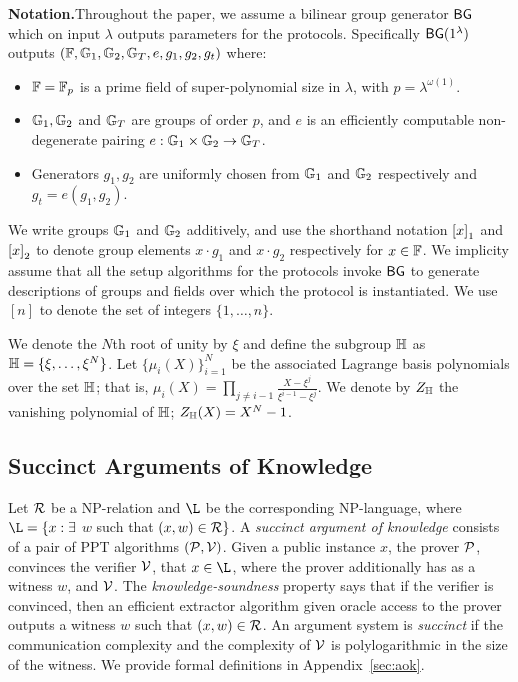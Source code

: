 
\noindent\textbf{Notation.}Throughout the paper, we assume a bilinear group generator $\mathsf{BG}$ which on input $\lambda$ outputs
parameters for the protocols. Specifically $\mathsf{BG}(1^{\lambda})$ outputs $(\mathbb{F},\mathbb{G}_1,\mathbb{G}_2,\mathbb{G}_T, e, g_1, g_2,g_t)$
where:
\begin{itemize}[leftmargin=2em, label=-]
	\item $\mathbb{F}={\mathbb{F}_p}$ is a prime field of super-polynomial size in $\lambda$, with $p=\lambda^{\omega(1)}$.
	\item $\mathbb{G}_1,\mathbb{G}_2$ and $\mathbb{G}_T$ are groups of order $p$, and $e$ is an efficiently computable non-degenerate
	pairing $e:\mathbb{G}_1\times \mathbb{G}_2\rightarrow \mathbb{G}_T$.
	\item Generators $g_1,g_2$ are uniformly chosen from $\mathbb{G}_1$ and $\mathbb{G}_2$ respectively and $g_t=e(g_1,g_2)$.
\end{itemize}
We write groups $\mathbb{G}_1$ and $\mathbb{G}_2$ additively, and use the shorthand notation $\left[{x}\right]_1$ and $\left[{x}\right]_2$
to denote group elements $x\cdot g_1$ and $x\cdot g_2$ respectively for $x\in \mathbb{F}$. We implicity assume
that all the setup algorithms for the protocols invoke $\mathsf{BG}$ to generate descriptions of groups and fields
over which the protocol is instantiated. We use $[n]$ to denote the set of integers $\{1,\ldots,n\}$.

We denote the $N$th root of unity by $\xi$ and define the subgroup $\mathbb{H}$ as $\mathbb{H} =\{\xi,\ldots,\xi^N\}$. 
Let $\{\mu_i(X)\}_{i=1}^N$ be the associated
Lagrange basis polynomials over the set $\mathbb{H}$; that is, $\mu_i(X) = \prod_{j\neq i-1} \frac{X-\xi^j}{\xi^{i-1}-\xi^j}$.
We denote by $Z_{\mathbb{H}}$ the vanishing polynomial of $\mathbb{H}$;  $Z_{\mathbb{H}}(X)=X^N-1$.

\subsection{Succinct Arguments of Knowledge}
Let $\mathcal{R}$ be a NP-relation and $\L$ be the corresponding NP-language, where $\L=\{x : \exists$ $w$ such that $(x,w) \in \mathcal{R}\}$. 
A \emph{succinct argument of knowledge} consists of a pair of PPT algorithms $(\mathcal{P},\mathcal{V})$.
Given a public instance $x$, the prover $\mathcal{P}$, convinces the verifier $\mathcal{V}$, that $x\in \L$, where the prover additionally has as a witness $w$, and $\mathcal{V}$.
The \emph{knowledge-soundness} property says that if the verifier is convinced, then an efficient extractor algorithm given oracle access to the prover outputs a witness $w$ such that $(x,w)\in \mathcal{R}$. An argument system is \emph{succinct} if the communication complexity and the complexity of $\mathcal{V}$ is polylogarithmic in the size of the witness. We provide formal definitions in Appendix~\ref{sec:aok}.

